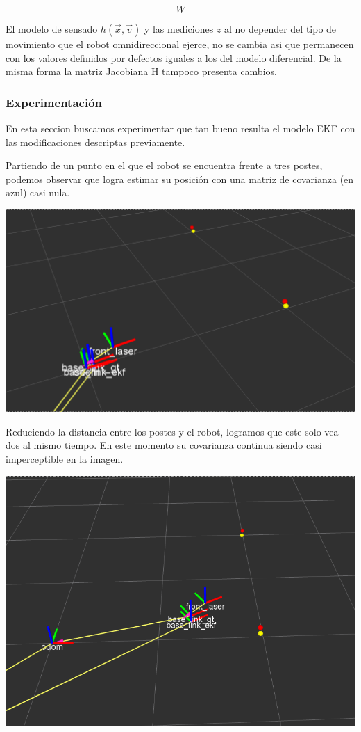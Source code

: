 $$W$$

El modelo de sensado $h(\overrightarrow{x},\overrightarrow{v})$ y las mediciones $z$ al no depender del tipo de movimiento que el robot omnidireccional ejerce, no se cambia asi que permanecen con los valores definidos por defectos iguales a los del modelo diferencial. De la misma forma la matriz Jacobiana H tampoco presenta cambios.


\subsubsection{Experimentación}

En esta seccion buscamos experimentar que tan bueno resulta el modelo EKF con las modificaciones descriptas previamente.

Partiendo de un punto en el que el robot se encuentra frente a tres postes, podemos observar que logra estimar su posición con una matriz de covarianza (en azul) casi nula.

\includegraphics[scale=0.3]{punto4/ekfViendoTodosLosPostes.png}

Reduciendo la distancia entre los postes y el robot, logramos que este solo vea dos al mismo tiempo. En este momento su covarianza continua siendo casi imperceptible en la imagen.

\includegraphics[scale=0.3]{punto4/ekfViendoDosPostes.png}


